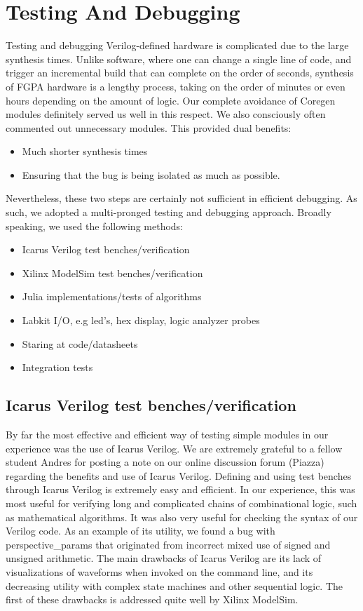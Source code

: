 \documentclass{article}
\begin{document}
\section{Testing And Debugging}

Testing and debugging Verilog-defined hardware is complicated due to the large synthesis times.
Unlike software, where one can change a single line of code,
and trigger an incremental build that can complete on the order of seconds,
synthesis of FGPA hardware is a lengthy process,
taking on the order of minutes or even hours depending on the amount of logic.
Our complete avoidance of Coregen modules definitely served us well in this respect.
We also consciously often commented out unnecessary modules.
This provided dual benefits:
\begin{itemize}
\item Much shorter synthesis times
\item Ensuring that the bug is being isolated as much as possible.
\end{itemize}
Nevertheless, these two steps are certainly not sufficient in efficient debugging.
As such, we adopted a multi-pronged testing and debugging approach.
Broadly speaking, we used the following methods:
\begin{itemize}
\item Icarus Verilog test benches/verification
\item Xilinx ModelSim test benches/verification
\item Julia implementations/tests of algorithms
\item Labkit I/O, e.g led's, hex display, logic analyzer probes
\item Staring at code/datasheets
\item Integration tests
\end{itemize}

\subsection{Icarus Verilog test benches/verification}
By far the most effective and efficient way of testing simple modules in our experience was the use of Icarus Verilog.
We are extremely grateful to a fellow student Andres for posting a note on our online discussion forum (Piazza) regarding the benefits and use of Icarus Verilog.
Defining and using test benches through Icarus Verilog is extremely easy and efficient.
In our experience, this was most useful for verifying long and complicated chains of combinational logic, such as mathematical algorithms.
It was also very useful for checking the syntax of our Verilog code.
As an example of its utility, we found a bug with perspective\_params that originated from incorrect mixed use of signed and unsigned arithmetic.
The main drawbacks of Icarus Verilog are its lack of visualizations of waveforms when invoked on the command line,
and its decreasing utility with complex state machines and other sequential logic.
The first of these drawbacks is addressed quite well by Xilinx ModelSim.
\end{document}
